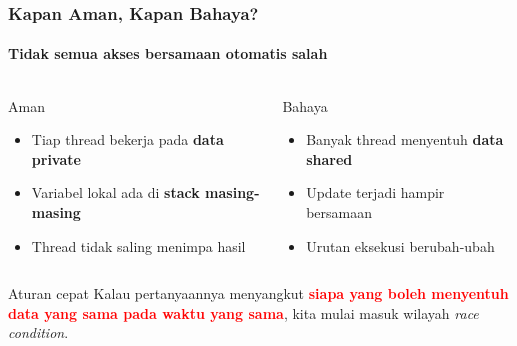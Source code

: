 \documentclass[t,aspectratio=169,xcolor=dvipsnames]{beamer}
\newcommand{\tem}[1]{\textbf{\textcolor{red}{#1}}}
\begin{document}
\begin{frame}
    \frametitle{Kapan Aman, Kapan Bahaya?}
    \framesubtitle{Tidak semua akses bersamaan otomatis salah}
    \small

    \begin{columns}[T]
        \begin{exampleblock}{Aman}
            \begin{itemize}
                \item Tiap thread bekerja pada \textbf{data private}
                \item Variabel lokal ada di \textbf{stack masing-masing}
                \item Thread tidak saling menimpa hasil
            \end{itemize}
        \end{exampleblock}

        \begin{alertblock}{Bahaya}
            \begin{itemize}
                \item Banyak thread menyentuh \textbf{data shared}
                \item Update terjadi hampir bersamaan
                \item Urutan eksekusi berubah-ubah
            \end{itemize}
        \end{alertblock}
    \end{columns}

    \vspace{0.2cm}
    \begin{block}{Aturan cepat}
        Kalau pertanyaannya menyangkut \tem{siapa yang boleh menyentuh data yang sama pada waktu yang sama}, kita mulai masuk wilayah \textit{race condition}.
    \end{block}
\end{frame}
\end{document}
